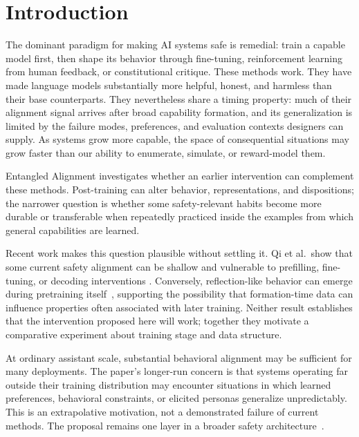 \documentclass[11pt]{article}
\begin{document}
	\ewfrontmatterend
	\section{Introduction}

The dominant paradigm for making AI systems safe is remedial: train a capable model first, then shape its behavior through fine-tuning, reinforcement learning from human feedback, or constitutional critique. These methods work. They have made language models substantially more helpful, honest, and harmless than their base counterparts. They nevertheless share a timing property: much of their alignment signal arrives after broad capability formation, and its generalization is limited by the failure modes, preferences, and evaluation contexts designers can supply. As systems grow more capable, the space of consequential situations may grow faster than our ability to enumerate, simulate, or reward-model them.

Entangled Alignment investigates whether an earlier intervention can complement these methods. Post-training can alter behavior, representations, and dispositions; the narrower question is whether some safety-relevant habits become more durable or transferable when repeatedly practiced inside the examples from which general capabilities are learned.

Recent work makes this question plausible without settling it. Qi et al.\ show that some current safety alignment can be shallow and vulnerable to prefilling, fine-tuning, or decoding interventions \cite{qi2024safety}. Conversely, reflection-like behavior can emerge during pretraining itself~\cite{rethinkingreflection2025}, supporting the possibility that formation-time data can influence properties often associated with later training. Neither result establishes that the intervention proposed here will work; together they motivate a comparative experiment about training stage and data structure.

At ordinary assistant scale, substantial behavioral alignment may be sufficient for many deployments. The paper's longer-run concern is that systems operating far outside their training distribution may encounter situations in which learned preferences, behavioral constraints, or elicited personas generalize unpredictably. This is an extrapolative motivation, not a demonstrated failure of current methods. The proposal remains one layer in a broader safety architecture~\cite{westerberg2025superintelligence}.
\end{document}
